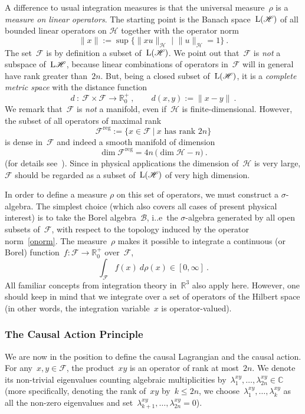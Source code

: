 \documentclass[reqno,11pt]{amsart}
\numberwithin{equation}{section}
\newcommand{\C}{\mathbb{C}}
\newcommand{\R}{\mathbb{R}}
\newcommand{\1}{\mbox{\rm 1 \hspace{-1.05 em} 1}}
\renewcommand{\H}{\mathscr{H}}
\newcommand{\F}{{\mathscr{F}}}
\newcommand{\Lin}{\text{\rm{L}}}
\begin{document}
A difference to usual integration measures is that the universal measure~$\rho$ is a {\em{measure on linear operators}}.
The starting point is the Banach space~$\Lin(\H)$ of all bounded linear operators on $\H$ together with the operator norm
\begin{equation} \label{onorm}
\|x\|:=\sup\big\{\|xu\|_\H\,\,\big|\,\,\|u\|_\H=1\big\} \:.
\end{equation}
The set~$\F$ is by definition a subset of~$\Lin(\H)$. We point out that~$\F$ is {\em{not}} a subspace
of~$\Lin{\H}$, because linear combinations of operators in~$\F$ will in general have rank
greater than~$2n$. But, being a closed subset of~$\Lin(\H)$, it is a {\em{complete metric space}} with the
distance function
\[ d \::\: \F \times \F \rightarrow \R^+_0 \:,\qquad d(x,y) := \|x-y\|\:. \]
We remark that~$\F$ is {\em{not}} a manifold, even if~$\H$ is finite-dimensional.
However, the subset of all operators of maximal rank
\[ \F^\text{reg} := \big\{ x \in \F \:\big|\: \text{$x$ has rank $2n$} \big\} \]
is dense in~$\F$ and indeed a smooth manifold of dimension
\[ \dim \F^{\text{reg}} = 4n\, \big( \dim \H - n \big) \:. \]
(for details see~\cite[Proposition~2.4.4]{intro}). Since in physical applications the dimension of~$\H$
is very large, $\F$ should be regarded as a subset of~$\Lin(\H)$ of very high dimension.

In order to define a measure $\rho$ on this set of operators, we must construct a $\sigma$-algebra.
The simplest choice (which also covers all cases of present physical interest) is to take the Borel algebra~${\mathcal{B}}$,
i..e\ the $\sigma$-algebra generated by all open subsets of~$\F$, with respect to the topology induced by the
operator norm~\eqref{onorm}.  The measure~$\rho$ makes it possible to integrate
a continuous (or Borel) function~$f : \F \rightarrow \R^+_0$ over~$\F$,
\[ \int_\F f(x)\: d\rho(x) \in [0, \infty] \:. \]
All familiar concepts from integration theory in~$\R^3$ also apply here. However, one should keep in mind
that we integrate over a set of operators of the Hilbert space
(in other words, the integration variable~$x$ is operator-valued).

\subsubsection{The Causal Action Principle} \label{seccap}
We are now in the position to define the causal Lagrangian and the causal action.
For any~$x, y \in \F$, the product~$x y$ is an operator
of rank at most~$2n$. We denote its non-trivial eigenvalues counting algebraic multiplicities
by~$\lambda^{xy}_1, \ldots, \lambda^{xy}_{2n} \in \C$
(more specifically,
denoting the rank of~$xy$ by~$k \leq 2n$, we choose~$\lambda^{xy}_1, \ldots, \lambda^{xy}_{k}$ as all
the non-zero eigenvalues and set~$\lambda^{xy}_{k+1}, \ldots, \lambda^{xy}_{2n}=0$).
\end{document}
